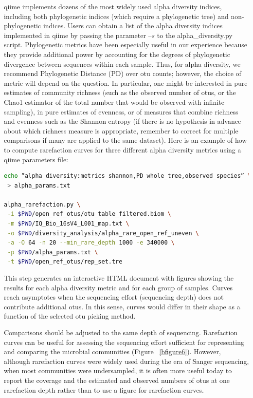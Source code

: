 \gls{qiime} implements dozens of the most widely used alpha diversity indices, including both
phylogenetic indices (which require a phylogenetic tree) and non-phylogenetic indices. Users
can obtain a list of the alpha diversity indices implemented in \gls{qiime} by passing the parameter
$–s$ to the alpha\_diversity.py script. Phylogenetic metrics have been especially useful
in our experience because they provide additional power by accounting for the degrees of
phylogenetic divergence between sequences within each sample. Thus, for alpha diversity,
we recommend Phylogenetic Distance (PD) \cite{Faith1992} over \gls{otu} counts; however, the choice
of metric will depend on the question. In particular, one might be interested in pure
estimates of community richness (such as the observed number of \gls{otu}s, or the Chao1 estimator
of the total number that would be observed with infinite sampling), in pure estimates of
evenness, or of measures that combine richness and evenness such as the Shannon entropy
(if there is no hypothesis in advance about which richness measure is appropriate, remember
to correct for multiple comparisons if many are applied to the same dataset). Here is an example
of how to compute rarefaction curves for three different alpha diversity metrics using a \gls{qiime} parameters file:

\begin{lstlisting}[language=bash]
echo “alpha_diversity:metrics shannon,PD_whole_tree,observed_species” \
 > alpha_params.txt

alpha_rarefaction.py \
 -i $PWD/open_ref_otus/otu_table_filtered.biom \
 -m $PWD/IQ_Bio_16sV4_L001_map.txt \
 -o $PWD/diversity_analysis/alpha_rare_open_ref_uneven \
 -a -O 64 -n 20 --min_rare_depth 1000 -e 340000 \
 -p $PWD/alpha_params.txt \
 -t $PWD/open_ref_otus/rep_set.tre
\end{lstlisting}

This step generates an interactive HTML document with figures showing the
results for each alpha diversity metric and for each group of samples. Curves
reach asymptotes when the sequencing effort (sequencing depth) does not contribute
additional \gls{otu}s. In this sense, curves would differ in their shape as a function
of the selected \gls{otu} picking method.

Comparisons should be adjusted to the same depth of sequencing. Rarefaction curves
can be useful for assessing the sequencing effort sufficient for representing and
comparing the microbial communities (Figure ~\ref{bfigure6}). However, although
rarefaction curves were widely used during the era of Sanger sequencing, when most
communities were undersampled, it is often more useful today to report the coverage
and the estimated and observed numbers of \gls{otu}s at one rarefaction depth rather than
to use a figure for rarefaction curves.

